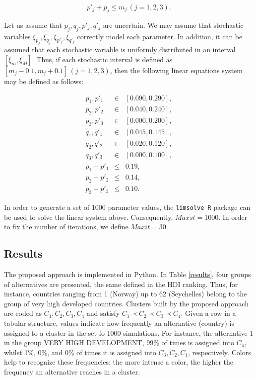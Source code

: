 \documentclass[]{elsarticle}
\theoremstyle{definition}
\begin{document}
\begin{equation}
p'_j+p_j \leq m_j \, (j=1,2,3). \label{thresholds}
\end{equation}



Let us assume that  $p_j,q_j,p'_j,q'_j$ are uncertain.  We may assume that stochastic variables $\xi_{p_j},\xi_{q_j},\xi_{p'_j},\xi_{q'_j}$ correctly model each parameter. In addition, it can be assumed that each stochastic variable is uniformly distributed in an interval  $[\xi_m, \xi_M]$. Thus, if each stochastic interval is defined as $[m_j-0.1, m_j+0.1] \,(j=1,2,3)$, then the following linear equations system may be defined as follows:

\begin{eqnarray}
p_1,p'_1 &\in& [0.090, 0.290], \nonumber\\
p_2,p'_2 &\in& [0.040, 0.240], \nonumber\\
p_3,p'_3 &\in& [0.000, 0.200], \nonumber\\
q_1,q'_1 &\in& [0.045, 0.145], \nonumber\\
q_2,q'_2 &\in& [0.020, 0.120], \nonumber\\
q_3,q'_3 &\in& [0.000, 0.100], \nonumber\\
p_1+p'_1 &\leq& 0.19, \nonumber\\
p_2+p'_2 &\leq& 0.14,  \nonumber\\
p_3+p'_3 &\leq& 0.10. \nonumber
\end{eqnarray}


\noindent
In order to generate a set of 1000 parameter values, the \texttt{limsolve  R} package can be used to solve the linear system above. Consequently, $Maxst=1000$.  In order to fix the number of iterations, we define $Maxit=30$.

\subsection{Results}

The proposed approach is implemented in Python.  In Table \ref{results}, four groups of alternatives  are presented, the same defined in the HDI ranking.  Thus, for instance,  countries ranging from  1 (Norway) up to 62 (Seychelles) belong to the group of very high developed countries. Clusters built by the proposed approach are coded as $C_1, C_2, C_3, C_4$ and satisfy $C_1 \prec  C_2 \prec C_3 \prec C_4$.  Given a row in a tabular structure, values indicate how frequently an alternative (country) is assigned to a cluster in the set fo 1000 simulations.  For instance, the alternative 1 in the group VERY HIGH DEVELOPMENT, 99\% of times is assigned into $C_4$, whilst 1\%, 0\%, and 0\% of times it is assigned into $C_3, C_2, C_1$, respectively.  Colors help to recognize these frequencies: the more intense a color, the higher the frequency an alternative reaches in a cluster.  
\end{document}
